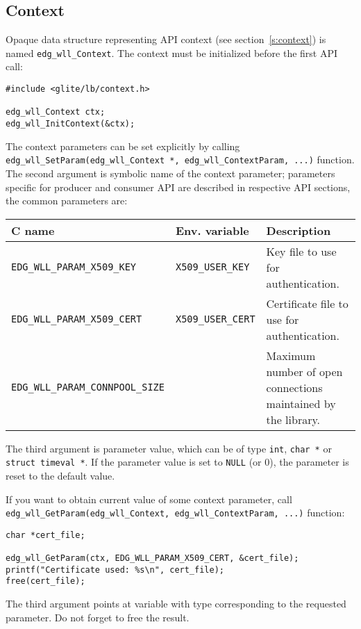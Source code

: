 \subsection{Context} 
\label{s:edg_wll_context}
Opaque data structure representing \LB API context (see
section~\ref{s:context}) is named \lstinline'edg_wll_Context'.
The context must be initialized before the first \LB API call:
\begin{lstlisting}
#include <glite/lb/context.h>

edg_wll_Context ctx;
edg_wll_InitContext(&ctx);
\end{lstlisting}

The context parameters can be set explicitly by calling
\lstinline'edg_wll_SetParam(edg_wll_Context *, edg_wll_ContextParam, ...)' 
function. The second argument is symbolic name of the context
parameter; parameters specific for producer and consumer API are
described in respective API sections, the common parameters are:

\begin{table}[h]
\begin{tabularx}{\textwidth}{llX}
{\bf C name} & {\bf Env. variable} & {\bf Description} \\
\hline
\lstinline'EDG_WLL_PARAM_X509_KEY' & \lstinline'X509_USER_KEY' & Key file to use for
authentication. \\
\lstinline'EDG_WLL_PARAM_X509_CERT' & \lstinline'X509_USER_CERT' & Certificate file to use
for authentication. \\
\lstinline'EDG_WLL_PARAM_CONNPOOL_SIZE' & & Maximum number
of open connections maintained by the library. \\
\end{tabularx}
\end{table}

The third argument is parameter value, which can be of type
\lstinline'int', \lstinline'char *' or \lstinline'struct timeval *'. 
If the parameter value is set to \lstinline'NULL' (or 0), the 
parameter is reset to the default value.

If you want to obtain current value of some context parameter, call
\lstinline'edg_wll_GetParam(edg_wll_Context, edg_wll_ContextParam, ...)' function:
\begin{lstlisting}
char *cert_file;

edg_wll_GetParam(ctx, EDG_WLL_PARAM_X509_CERT, &cert_file);
printf("Certificate used: %s\n", cert_file);
free(cert_file);
\end{lstlisting}
The third argument points at variable with type corresponding to the
requested parameter. Do not forget to free the result.

